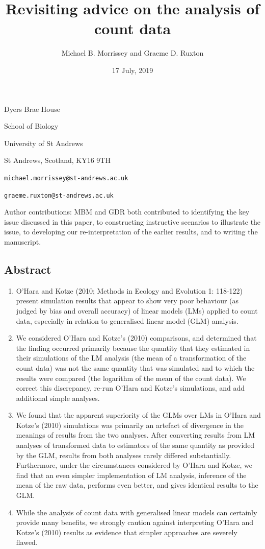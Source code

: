 \documentclass[]{article}
\title{Revisiting advice on the analysis of count data}
\author{Michael B. Morrissey and Graeme D. Ruxton}
\date{17 July, 2019}
\begin{document}
\maketitle

Dyers Brae House

School of Biology

University of St Andrews

St Andrews, Scotland, KY16 9TH

\texttt{michael.morrissey@st-andrews.ac.uk}

\texttt{graeme.ruxton@st-andrews.ac.uk}

Author contributions: MBM and GDR both contributed to identifying the
key issue discussed in this paper, to constructing instructive scenarios
to illustrate the issue, to developing our re-interpretation of the
earlier results, and to writing the manuscript.

\clearpage

\subsection{Abstract}\label{abstract}

\begin{enumerate}
\def\labelenumi{(\arabic{enumi})}
\item
  O'Hara and Kotze (2010; Methods in Ecology and Evolution 1: 118-122)
  present simulation results that appear to show very poor behaviour (as
  judged by bias and overall accuracy) of linear models (LMs) applied to
  count data, especially in relation to generalised linear model (GLM)
  analysis.
\item
  We considered O'Hara and Kotze's (2010) comparisons, and determined
  that the finding occurred primarily because the quantity that they
  estimated in their simulations of the LM analysis (the mean of a
  transformation of the count data) was not the same quantity that was
  simulated and to which the results were compared (the logarithm of the
  mean of the count data). We correct this discrepancy, re-run O'Hara
  and Kotze's simulations, and add additional simple analyses.
\item
  We found that the apparent superiority of the GLMs over LMs in O'Hara
  and Kotze's (2010) simulations was primarily an artefact of divergence
  in the meanings of results from the two analyses. After converting
  results from LM analyses of transformed data to estimators of the same
  quantity as provided by the GLM, results from both analyses rarely
  differed substantially. Furthermore, under the circumstances
  considered by O'Hara and Kotze, we find that an even simpler
  implementation of LM analysis, inference of the mean of the raw data,
  performs even better, and gives identical results to the GLM.
\item
  While the analysis of count data with generalised linear models can
  certainly provide many benefits, we strongly caution against
  interpreting O'Hara and Kotze's (2010) results as evidence that
  simpler approaches are severely flawed.
\end{enumerate}
\end{document}
